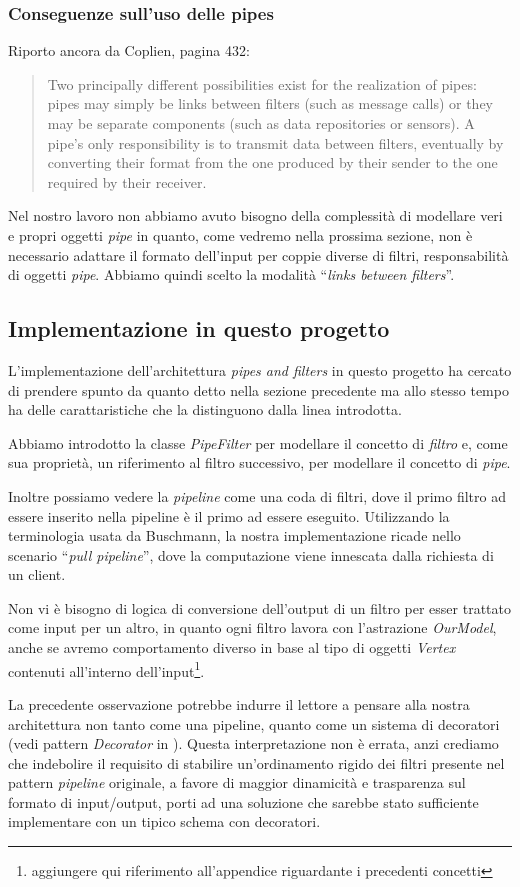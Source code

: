 \subsubsection{Conseguenze sull'uso delle pipes}
Riporto ancora da Coplien, pagina 432:
\begin{quotation}
  Two principally different possibilities exist for the realization of
  pipes: pipes may simply be links between filters (such as message
  calls) or they may be separate components (such as data repositories
  or sensors). A pipe's only responsibility is to transmit data
  between filters, eventually by converting their format from the one
  produced by their sender to the one required by their receiver.
\end{quotation}
Nel nostro lavoro non abbiamo avuto bisogno della complessit\`a di
modellare veri e propri oggetti \emph{pipe} in quanto, come vedremo
nella prossima sezione, non \`e necessario adattare il formato
dell'input per coppie diverse di filtri, responsabilit\`a di oggetti
\emph{pipe}. Abbiamo quindi scelto la modalit\`a ``\emph{links between
  filters}''.

\subsection{Implementazione in questo progetto}
L'implementazione dell'architettura \emph{pipes and filters} in questo
progetto ha cercato di prendere spunto da quanto detto nella sezione
precedente ma allo stesso tempo ha delle carattaristiche che la
distinguono dalla linea introdotta.

Abbiamo introdotto la classe \emph{PipeFilter} per modellare il
concetto di \emph{filtro} e, come sua propriet\`a, un riferimento al
filtro successivo, per modellare il concetto di \emph{pipe}.

Inoltre possiamo vedere la \emph{pipeline} come una coda di filtri,
dove il primo filtro ad essere inserito nella pipeline \`e il primo ad
essere eseguito. Utilizzando la terminologia usata da Buschmann, la
nostra implementazione ricade nello scenario ``\emph{pull pipeline}'',
dove la computazione viene innescata dalla richiesta di un client.

Non vi \`e bisogno di logica di conversione dell'output di un filtro
per esser trattato come input per un altro, in quanto ogni filtro
lavora con l'astrazione \emph{OurModel}, anche se avremo comportamento
diverso in base al tipo di oggetti \emph{Vertex} contenuti all'interno
dell'input\footnote{aggiungere qui riferimento all'appendice
  riguardante i precedenti concetti}.

La precedente osservazione potrebbe indurre il lettore a pensare alla
nostra architettura non tanto come una pipeline, quanto come un
sistema di decoratori (vedi pattern \emph{Decorator} in
\cite{SmalltalkCompanion98}). Questa interpretazione non \`e errata,
anzi crediamo che indebolire il requisito di stabilire un'ordinamento
rigido dei filtri presente nel pattern \emph{pipeline} originale, a
favore di maggior dinamicit\`a e trasparenza sul formato di
input/output, porti ad una soluzione che sarebbe stato sufficiente
implementare con un tipico schema con decoratori.
